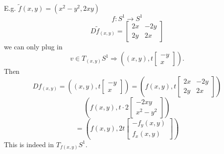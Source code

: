 \begin{remark}
\begin{enumerate}
    E.g. $\tilde{f}(x,y)=(x^2-y^2,2xy)$
      $$f:S^1 \to S^1$$
    $$D\tilde{f}_{(x,y)}=
      \begin{bmatrix}
        2x & -2y \\
        2y & 2x
      \end{bmatrix}
      $$
      we can only plug in $$v\in T_{(x,y)}S^1 \Rightarrow \left((x,y),t
\begin{bmatrix}
  -y \\
  x
\end{bmatrix}
      \right).$$
      Then
        $$Df_{(x,y)}=\left((x,y),t
  \begin{bmatrix}
    -y \\
    x
  \end{bmatrix}
        \right)=\left(f(x,y),t
        \begin{bmatrix}
          2x & -2y \\
          2y & 2x
        \end{bmatrix}\right)
        $$
    $$
\left(f(x,y), t \cdot 2
\begin{bmatrix}
  -2xy \\
  x^2-y^2
\end{bmatrix}
\right)
    $$
    $$
    =\left(f(x,y), 2t
    \begin{bmatrix}
      -f_y(x,y) \\
      f_x(x,y)
    \end{bmatrix}
    \right)
    $$
  This is indeed in $T_{f(x,y)}S^1$.
  \end{enumerate}
\end{remark}

